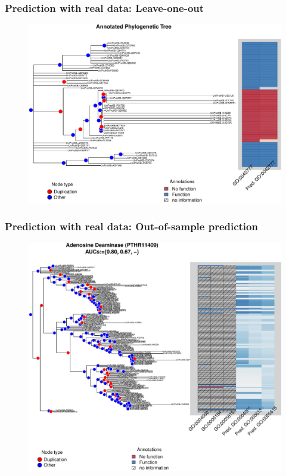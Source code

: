 \documentclass[aspectratio=169, 9pt, handout]{beamer}\usepackage[]{graphicx}\usepackage[]{color}
\begin{document}
\begin{frame}
\frametitle{Prediction with real data: Leave-one-out}

\begin{figure}
\centering
\includegraphics[width=.7\linewidth]{annotations1.pdf}
\end{figure}

\end{frame}

\begin{frame}
\frametitle{Prediction with real data: Out-of-sample prediction}

\begin{figure}
\centering
\includegraphics[width=.65\linewidth]{out-of-sample1-1.pdf}
\end{figure}

\end{frame}
\end{document}
